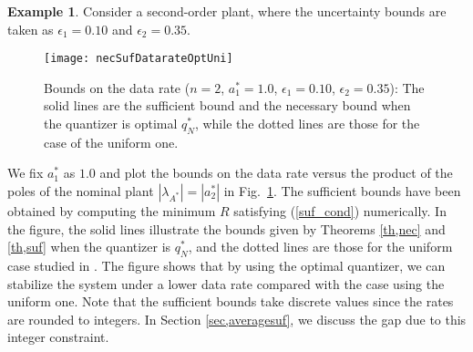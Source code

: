 \documentclass[a4paper, 11pt]{article}
\newcommand{\lambdaAS}{\lambda_{A^*}\!}
\theoremstyle{definition}
\newtheorem{exmp}{Example}
\newcommand{\fref}[1]{Fig.~\ref{#1}}
\begin{document}
\begin{exmp}\label{ex,necsuf}
Consider a second-order plant, where the uncertainty bounds are taken as
$\epsilon_1=0.10$ and $\epsilon_2=0.35$.
\begin{figure}[t]
 \centering
 \texttt{[image: necSufDatarateOptUni]}
 \caption{Bounds on the data rate ($n=2$, $a_1^*=1.0$, $\epsilon_1=0.10$,
 $\epsilon_2=0.35$):
 The solid lines are the sufficient bound and the necessary bound when
 the quantizer is optimal $q_N^*$, while the dotted lines are those for
 the case of the uniform one.}
 \label{fig,necSufDatarateOptUni}
\end{figure}
We fix $a_1^*$ as $1.0$ and plot the bounds on the data rate
versus the product of the poles of the nominal plant $|\lambdaAS|=|a_2^*|$
in \fref{fig,necSufDatarateOptUni}.
The sufficient bounds have been obtained by computing the minimum $R$ satisfying
(\ref{suf_cond}) numerically.
In the figure, the solid lines illustrate the bounds given by Theorems \ref{th,nec}
and \ref{th,suf} when the quantizer is $q_N^*$, and the dotted lines are
those for the uniform case studied in \cite{Okano2012}.
The figure shows that by using the optimal quantizer, we can stabilize
the system under a lower data rate compared with the case using the uniform
one.
Note that the sufficient bounds take discrete values since the rates are
rounded to integers.
In Section \ref{sec,averagesuf}, we discuss the gap due to this integer constraint.
\end{exmp}
\end{document}
